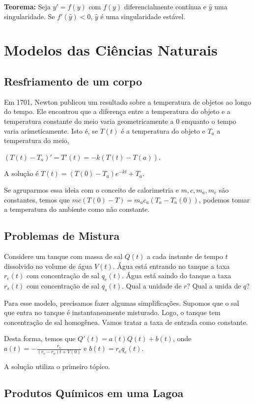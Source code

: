 \documentclass[12pt]{article}
\begin{document}
\textbf{Teorema:} Seja $y' = f(y)$ com $f(y)$ diferencialmente contínua e
$\hat{y}$ uma singularidade. Se $f'(\hat{y}) < 0$, $\hat{y}$ é uma
singularidade estável. 

\section{Modelos das Ciências Naturais}

\subsection{Resfriamento de um corpo}

Em 1701, Newton publicou um resultado sobre a temperatura de objetos ao longo
do tempo. Ele encontrou que a diferença entre a temperatura do objeto e a
temperatura constante do meio varia geometricamente a 0 enquanto o tempo varia
arimeticamente. Isto é, se $T(t)$ é a temperatura do objeto e $T_a$ a
temperatura do meio, 

$(T(t) - T_a)' = T'(t) = -k(T(t) - T(a))$. 

A solução é $T(t) = (T(0) - T_a)e^{-kt} + T_a$. 

Se agruparmos essa ideia com o conceito de calorimetria e $m,c,m_a, m_c$
são constantes, temos que $mc(T(0) - T) = m_ac_a(T_a - T_a(0))$, podemos tomar
a temperatura do ambiente como não constante. 

\subsection{Problemas de Mistura}

Considere um tanque com massa de sal $Q(t)$ a cada instante de tempo $t$
dissolvido no volume de água $V(t)$. Água está entrando no tanque a taxa
$r_e(t)$ com concentração de sal $q_e(t)$. Água está saindo do tanque a taxa
$r_s(t)$ com concentração de sal $q_s(t)$. Qual a unidade de $r$? Qual a unida
de $q$? 

Para esse modelo, precisamos fazer algumas simplificações. Supomos que o sal
que entra no tanque é instantaneamente misturado. Logo, o tanque tem
concentração de sal homogênea. Vamos tratar a taxa de entrada como constante. 

Desta forma, temos que $Q'(t) = a(t)Q(t) + b(t)$, onde $a(t) =
-\frac{r_s}{(r_e - r_o)t + V(0)}$ e $b(t) = r_eq_e(t)$.

A solução utiliza o primeiro tópico. 

\subsection{Produtos Químicos em uma Lagoa}
\end{document}
